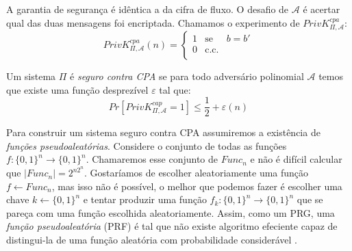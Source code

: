 \begin{center}
\end{center}

A garantia de segurança é idêntica a da cifra de fluxo.
O desafio de $\mathcal{A}$ é acertar qual das duas mensagens foi encriptada.
Chamamos o experimento de $PrivK^{cpa}_{\Pi, \mathcal{A}}$:
\begin{displaymath}
  PrivK^{cpa}_{\Pi, \mathcal{A}}(n) = \left\{
    \begin{array}{lcl}
      1 & \textrm{se} & b = b'\\
      0 & \textrm{c.c.} &\\
    \end{array}
    \right.
\end{displaymath}

Um sistema $\Pi$ é {\em seguro contra CPA} se para todo adversário polinomial $\mathcal{A}$ temos que existe uma função desprezível $\varepsilon$ tal que:
\begin{displaymath}
  Pr[PrivK^{cap}_{\Pi, \mathcal{A}} = 1] \leq \frac{1}{2} + \varepsilon(n)
\end{displaymath}

Para construir um sistema seguro contra CPA assumiremos a existência de {\em funções pseudoaleatórias}.
Considere o conjunto de todas as funções $f: \{0,1\}^n \to \{0,1\}^n$.
Chamaremos esse conjunto de $Func_n$ e não é difícil calcular que $|Func_n| = 2^{n2^n}$.
Gostaríamos de escolher aleatoriamente uma função $f \leftarrow Func_n$, mas isso não é possível, o melhor que podemos fazer é escolher uma chave $k \leftarrow \{0,1\}^n$ e tentar produzir uma função $f_k: \{0,1\}^n \to \{0,1\}^n$ que se pareça com uma função escolhida aleatoriamente.
Assim, como um PRG, uma {\em função pseudoaleatória} (PRF) é tal que não existe algoritmo efeciente capaz de distingui-la de uma função aleatória com probabilidade considerável \cite{Goldreich86}.

